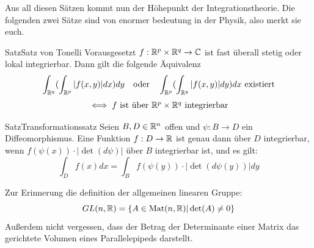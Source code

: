 \newpage
Aus all diesen Sätzen kommt nun der Höhepunkt der Integrationstheorie. Die folgenden zwei Sätze sind von enormer bedeutung in der Physik, also merkt sie euch. 
\begin{Satz}{Satz}{Satz von Tonelli}
    Vorausgesetzt $f:\mathbb{R}^p\times \mathbb{R}^q \rightarrow \mathbb{C}$ ist fast überall stetig oder lokal integrierbar. Dann gilt die folgende Äquivalenz
    $$\int_{\mathbb{R}^q}(\int_{\mathbb{R}^p} |f(x,y)|dx)dy \quad\mbox{oder}\quad\int_{\mathbb{R}^p}(\int_{\mathbb{R}^q} |f(x,y)|dy)dx\mbox{ existiert} $$
    $$\iff \mbox{$f$ ist über $\mathbb{R}^p\times\mathbb{R}^q$ integrierbar}$$
\end{Satz}
\begin{Satz}{Satz}{Transformationssatz}
Seien $B,D\in\mathbb{R}^n$ offen und $\psi: B\rightarrow D$ ein Diffeomorphismus. Eine Funktion $f: D\rightarrow \mathbb{R}$ ist genau dann über $D$ integrierbar, wenn $f(\psi(x))\cdot|\det(d\psi)|$ über $B$ integrierbar ist, und es gilt:
$$\int_D f(x) dx = \int_B f(\psi(y))\cdot|\det(d\psi(y))|dy$$
\end{Satz}
Zur Erinnerung die definition der allgemeinen linearen Gruppe: $$GL(n,\mathbb{R})=\{A\in \mbox{Mat}(n,\mathbb{R})| \det(A)\neq0\}$$
Außerdem nicht vergessen, dass der Betrag der Determinante einer Matrix das gerichtete Volumen eines Parallelepipeds darstellt.
